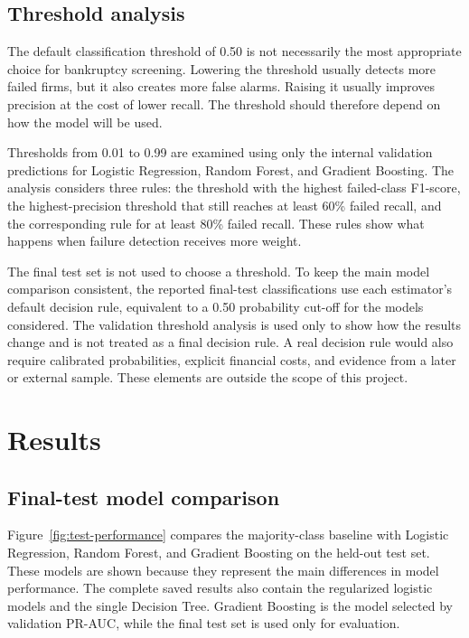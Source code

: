\documentclass[11pt,a4paper]{article}
\begin{document}
\subsection{Threshold analysis}

The default classification threshold of 0.50 is not necessarily the most
appropriate choice for bankruptcy screening. Lowering the threshold usually
detects more failed firms, but it also creates more false alarms. Raising it
usually improves precision at the cost of lower recall. The threshold should
therefore depend on how the model will be used.

Thresholds from 0.01 to 0.99 are examined using only the internal validation
predictions for Logistic Regression, Random Forest, and Gradient Boosting. The
analysis considers three rules: the threshold with the highest failed-class
F1-score, the highest-precision threshold that still reaches at least 60\%
failed recall, and the corresponding rule for at least 80\% failed recall.
These rules show what happens when failure detection receives more weight.

The final test set is not used to choose a threshold. To keep the main model
comparison consistent, the reported final-test classifications use each
estimator's default decision rule, equivalent to a 0.50 probability cut-off for
the models considered. The validation threshold analysis is used only to show
how the results change and is not treated as a final decision rule. A real decision rule would also
require calibrated probabilities, explicit financial costs, and evidence from a
later or external sample. These elements are outside the scope of this project.

\section{Results}
\label{sec:results}

\subsection{Final-test model comparison}

Figure~\ref{fig:test-performance} compares the majority-class baseline with
Logistic Regression, Random Forest, and Gradient Boosting on the held-out test
set. These models are shown because they represent the main differences in model
performance. The complete saved results also contain the regularized logistic
models and the single Decision Tree. Gradient Boosting is the model selected
by validation PR-AUC, while the final test set is used only for evaluation.
\end{document}
